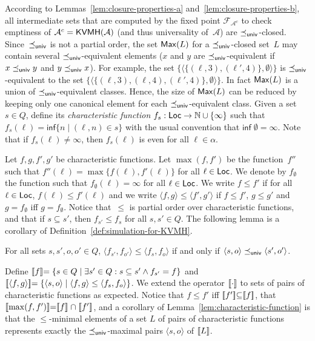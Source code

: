 \documentclass{LMCS}
\def\sg{\mathrel[\joinrel\mathrel[}
\def\sd{\mathrel]\joinrel\mathrel]}
\newcommand{\nat}{\mathbb N}
\newcommand{\sem}[1]{\sg \mathrel{#1} \sd}
\renewcommand{\l}{{\ell}}
\newcommand{\Loc}{{\sf Loc}}
\newcommand{\tuple}[1]{\langle #1 \rangle}
\renewcommand{\inf}{\mathsf{inf}}
\newcommand{\A}{\mathcal{A}}
\newcommand{\F}{\mathcal{F}}
\newcommand{\KVMH}{{\sf KVMH}}
\newcommand{\Max}{{\sf Max}}
\begin{document}
According to Lemmas~\ref{lem:closure-properties-a} and~\ref{lem:closure-properties-b}, 
all intermediate sets that are computed by the fixed point $\F_{\A^c}$ to check emptiness of
$\A^c = \KVMH(\A)$ (and thus universality of~$\A$) are $\preceq_{{\sf univ}}$-closed. 
Since~$\preceq_{{\sf univ}}$ is not a partial order, 
the set $\Max(L)$ for a $\preceq_{{\sf univ}}$-closed set~$L$
may contain several $\preceq_{{\sf univ}}$-equivalent elements ($x$ and $y$ are 
$\preceq_{{\sf univ}}$-equivalent if $x \preceq_{{\sf univ}} y$ and $y \preceq_{{\sf univ}} x$).
For example, the set $\{\tuple{\{(\l,3),(\l',4)\},\emptyset}\}$ is 
$\preceq_{{\sf univ}}$-equivalent to the set 
$\{\tuple{\{(\l,3),(\l,4),(\l',4)\},\emptyset}\}$.
In fact $\Max(L)$ is a union of $\preceq_{{\sf univ}}$-equivalent classes.
Hence, the size of $\Max(L)$ can be reduced by keeping only one canonical 
element for each $\preceq_{{\sf univ}}$-equivalent class.
Given a set $s \in Q$, define its \emph{characteristic function} $f_s:\Loc \to \nat
\cup \{ \infty \}$ such that $f_s(\l) = \inf\{n \mid (\l,n) \in s\}$
with the usual convention that $\inf\; \emptyset = \infty$.
Note that if $f_s(\l) \neq \infty$, then $f_s(\l)$ is even for all $\l \in \alpha$.

Let $f,g,f',g'$ be characteristic functions. Let $\max(f,f')$ be the function~$f''$ 
such that $f''(\l) = \max\{f(\l), f'(\l)\}$ for all $\l \in \Loc$.
We denote by $f_{\emptyset}$ the function such that $f_{\emptyset}(\l) = \infty$ for all $\l \in \Loc$.  
We write $f \leq f'$ if for all $\l \in \Loc$, $f(\l) \leq f'(\l)$ and we write 
$\tuple{f,g} \leq \tuple{f',g'}$ if $f \leq f'$, $g \leq g'$ and $g = f_{\emptyset}$ iff $g = f_{\emptyset}$.
Notice that~$\leq$ is partial order over characteristic functions,
and that if $s \subseteq s'$, then $f_{s'} \leq f_s$ for all $s,s' \in Q$.
The following lemma is a corollary of Definition~\ref{def:simulation-for-KVMH}.

\begin{lem}\label{lem:characteristic-function}
  For all sets $s,s',o,o' \in Q$, $\tuple{f_{s'},f_{o'}} \leq  \tuple{f_{s},f_{o}}$
  if and only if $\tuple{s,o} \preceq_{{\sf univ}} \tuple{s',o'}$.
\end{lem}


Define $\sem{f} = \{s \in Q \mid \exists s' \in Q: s \subseteq s' \land f_{s'} = f\}$ and 
$\sem{\tuple{f,g}} = \{\tuple{s,o} \mid \tuple{f,g} \leq  \tuple{f_{s},f_{o}} \}$.
We extend the operator $\sem{\cdot}$ to sets of pairs of characteristic
functions as expected. 
Notice that $f \leq f'$ iff $\sem{f'} \subseteq \sem{f}$, that $\sem{\max(f,f')} = \sem{f} \cap \sem{f'}$, and 
a corollary of Lemma~\ref{lem:characteristic-function} is that 
the $\leq$-minimal elements of a set $L$ of pairs of characteristic functions
represents exactly the $\preceq_{{\sf univ}}$-maximal pairs $\tuple{s,o}$ of $\sem{L}$.
\end{document}
